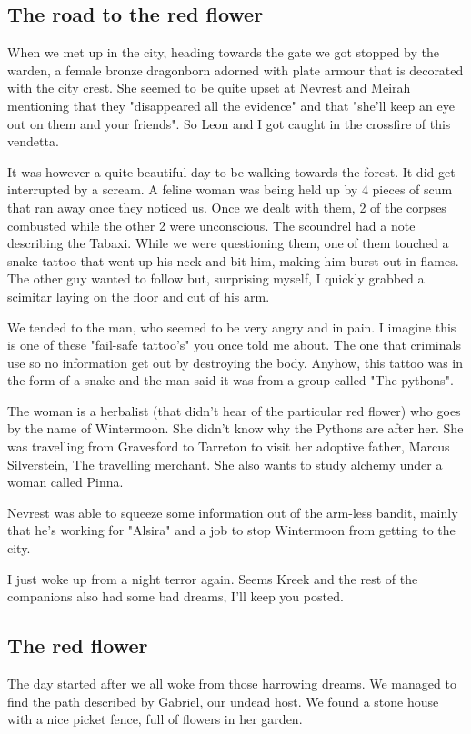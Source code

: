 \subsection*{The road to the red flower}

When we met up in the city, heading towards the gate we got stopped by the warden, a female bronze dragonborn adorned with plate armour that is decorated with the city crest. She seemed to be quite upset at Nevrest and Meirah mentioning that they "disappeared all the evidence" and that "she'll keep an eye out on them and your friends". So Leon and I got caught in the crossfire of this vendetta.

It was however a quite beautiful day to be walking towards the forest. It did get interrupted by a scream. A feline woman was being held up by 4 pieces of scum that ran away once they noticed us. Once we dealt with them, 2 of the corpses combusted while the other 2 were unconscious. The scoundrel had a note describing the Tabaxi. While we were questioning them, one of them touched a snake tattoo that went up his neck and bit him, making him burst out in flames. The other guy wanted to follow but, surprising myself, I quickly grabbed a scimitar laying on the floor and cut of his arm.

We tended to the man, who seemed to be very angry and in pain. I imagine this is one of these "fail-safe tattoo's" you once told me about. The one that criminals use so no information get out by destroying the body. Anyhow, this tattoo was in the form of a snake and the man said it was from a group called "The pythons".

The woman is a herbalist (that didn't hear of the particular red flower) who goes by the name of Wintermoon. She didn't know why the Pythons are after her. She was travelling from Gravesford to Tarreton to visit her adoptive father, Marcus Silverstein, The travelling merchant. She also wants to study alchemy under a woman called Pinna.

Nevrest was able to squeeze some information out of the arm-less bandit, mainly that he's working for "Alsira" and a job to stop Wintermoon from getting to the city.

I just woke up from a night terror again. Seems Kreek and the rest of the companions also had some bad dreams, I'll keep you posted.

\subsection*{The red flower}
The day started after we all woke from those harrowing dreams. We managed to find the path described by Gabriel, our undead host. We found a stone house with a nice picket fence, full of flowers in her garden.

